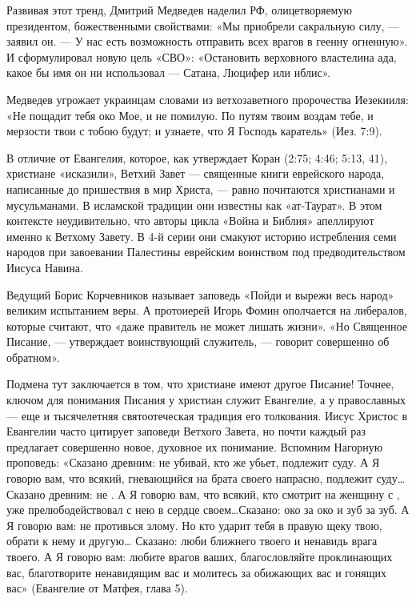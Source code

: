 Развивая этот тренд, Дмитрий Медведев наделил РФ, олицетворяемую президентом, божественными свойствами: «Мы приобрели сакральную силу, — заявил он. — У нас есть возможность отправить всех врагов в геенну огненную». И сформулировал новую цель «СВО»: «Остановить верховного властелина ада, какое бы имя он ни использовал — Сатана, Люцифер или иблис».

\begin{fancyquotes}
    Медведев угрожает украинцам словами из ветхозаветного пророчества Иезекииля: «Не пощадит тебя око Мое, и не помилую. По путям твоим воздам тебе, и мерзости твои с тобою будут; и узнаете, что Я Господь каратель» (Иез. 7:9).
\end{fancyquotes}

В отличие от Евангелия, которое, как утверждает Коран (2:75; 4:46; 5:13, 41), христиане «исказили», Ветхий Завет — священные книги еврейского народа, написанные до пришествия в мир Христа, — равно почитаются христианами и мусульманами. В исламской традиции они известны как «ат-Таурат». В этом контексте неудивительно, что авторы цикла «Война и Библия» апеллируют именно к Ветхому Завету. В 4-й серии они смакуют историю истребления семи народов при завоевании Палестины еврейским воинством под предводительством Иисуса Навина.

Ведущий Борис Корчевников называет заповедь «Пойди и вырежи весь народ» великим испытанием веры. А протоиерей Игорь Фомин ополчается на либералов, которые считают, что «даже правитель не может лишать жизни». «Но Священное Писание, — утверждает воинствующий служитель, — говорит совершенно об обратном».

Подмена тут заключается в том, что христиане имеют другое Писание! Точнее, ключом для понимания Писания у христиан служит Евангелие, а у православных — еще и тысячелетняя святоотеческая традиция его толкования. Иисус Христос в Евангелии часто цитирует заповеди Ветхого Завета, но почти каждый раз предлагает совершенно новое, духовное их понимание. Вспомним Нагорную проповедь: «Сказано древним: не убивай, кто же убьет, подлежит суду. А Я говорю вам, что всякий, гневающийся на брата своего напрасно, подлежит суду… Сказано древним: не . А Я говорю вам, что всякий, кто смотрит на женщину с , уже прелюбодействовал с нею в сердце своем\dots Сказано: око за око и зуб за зуб. А Я говорю вам: не противься злому. Но кто ударит тебя в правую щеку твою, обрати к нему и другую… Сказано: люби ближнего твоего и ненавидь врага твоего. А Я говорю вам: любите врагов ваших, благословляйте проклинающих вас, благотворите ненавидящим вас и молитесь за обижающих вас и гонящих вас» (Евангелие от Матфея, глава 5).


